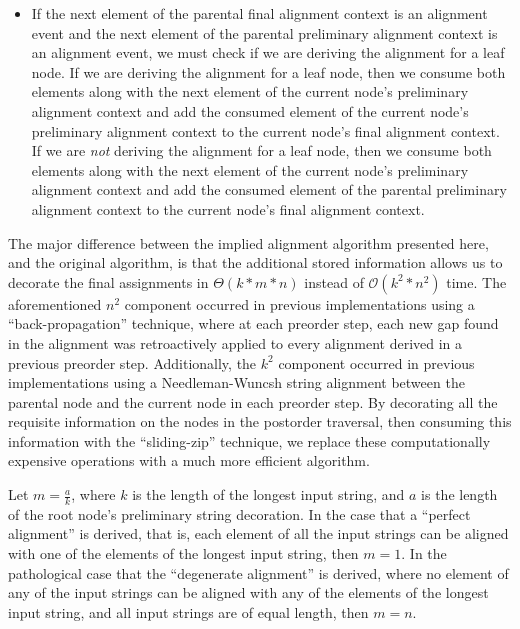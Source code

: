 \documentclass[11pt]{article}
\begin{document}
\begin{itemize}
\item If the next element of the parental final alignment context is an alignment event and the next element of the parental preliminary alignment context is an alignment event, we must check if we are deriving the alignment for a leaf node.
If we are deriving the alignment for a leaf node, then we consume both elements along with the next element of the current node's preliminary alignment context and add the consumed element of the current node's preliminary alignment context to the current node's final alignment context.
If we are \textit{not} deriving the alignment for a leaf node, then we consume both elements along with the next element of the current node's preliminary alignment context and add the consumed element of the parental preliminary alignment context to the current node's final alignment context.

\end{itemize}

The major difference between the implied alignment algorithm presented here, and the original algorithm, is that the additional stored information allows us to decorate the final assignments in $\Theta(k * m * n)$ instead of $\mathcal{O}(k^2 * n^2)$ time. 
The aforementioned $n^2$ component occurred in previous implementations using a ``back-propagation'' technique, where at each preorder step, each new gap found in the alignment was retroactively applied to every alignment derived in a previous preorder step.
Additionally, the $k^2$ component occurred in previous implementations using a Needleman-Wuncsh string alignment between the parental node and the current node in each preorder step.
By decorating all the requisite information on the nodes in the postorder traversal, then consuming this information with the ``sliding-zip'' technique, we replace these computationally expensive operations with a much more efficient algorithm.

Let $m = \frac{a}{k}$, where $k$ is the length of the longest input string, and $a$ is the length of the root node's preliminary string decoration.
In the case that a ``perfect alignment'' is derived, that is, each element of all the input strings can be aligned with one of the elements of the longest input string, then $m = 1$.
In the pathological case that the ``degenerate alignment'' is derived, where no element of any of the input strings can be aligned with any of the elements of the longest input string, and all input strings are of equal length, then $m = n$.
\end{document}
